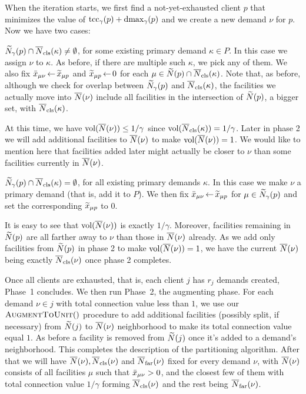 When the iteration starts, we first find a not-yet-exhausted client
$p$ that minimizes the value of $\textrm{tcc}_\gamma(p) + \text{dmax}_\gamma(p)$ and
we create a new demand $\nu$ for $p$.  Now we have two cases:
%
\begin{description}
%
\item{} ${\widetilde N}_{\gamma}(p) \cap
  {\overline{N}}_{\text{cls}}(\kappa)\neq\emptyset$, for some existing primary demand
  $\kappa\in P$.  In this case we assign $\nu$ to $\kappa$. As before, if
  there are multiple such $\kappa$, we pick any of them. We also fix
  ${\bar x}_{\mu \nu} {\,\leftarrow\,} {\widetilde x}_{\mu p}$ and ${\widetilde x}_{\mu p}{\,\leftarrow\,} 0$
  for each $\mu \in {\widetilde N}(p)\cap {\overline{N}}_{\text{cls}}(\kappa)$. Note that, as before,
  although we check for overlap between ${\widetilde N}_{\gamma}(p)$ and
  ${\overline{N}}_{\text{cls}}(\kappa)$, the facilities we actually move into
  ${\overline{N}}(\nu)$ include all facilities in the intersection of
  ${\widetilde N}(p)$, a bigger set, with ${\overline{N}}_{\text{cls}}(\kappa)$.

  At this time, we have $\textrm{vol}({\overline{N}}(\nu)) \leq 1/\gamma$ since
  $\textrm{vol}({\overline{N}}_{\text{cls}}(\kappa)) = 1/\gamma$. Later in phase 2 we will add
  additional facilities to ${\overline{N}}(\nu)$ to make
  $\textrm{vol}({\overline{N}}(\nu))=1$. We would like to mention here that facilities
  added later might actually be closer to $\nu$ than some facilities
  currently in ${\overline{N}}(\nu)$.

%
\item{} ${\widetilde N}_{\gamma}(p) \cap {\overline{N}}_{\text{cls}}(\kappa) =
  \emptyset$, for all existing primary demands $\kappa$.  In this case
  we make $\nu$ a primary demand (that is, add it to $P$). We then fix ${\bar x}_{\mu \nu}{\,\leftarrow\,}
  {\widetilde x}_{\mu p}$ for $\mu \in {\widetilde N}_{\gamma}(p)$ and set the
  corresponding ${\widetilde x}_{\mu p}$ to $0$.  

  It is easy to see that $\textrm{vol}({\overline{N}}(\nu))$ is exactly
  $1/\gamma$. Moreover, facilities remaining in ${\widetilde N}(p)$ are all
  farther away to $\nu$ than those in ${\overline{N}}(\nu)$ already. As we add
  only facilities from ${\widetilde N}(p)$ in phase 2 to make
  $\textrm{vol}({\overline{N}}(\nu))=1$, we have the current ${\overline{N}}(\nu)$ being
  exactly ${\overline{N}}_{\text{cls}}(\nu)$ once phase 2 completes.
%
\end{description}
%
Once all clients are exhausted, that is, each client $j$ has $r_j$
demands created, Phase~1 concludes. We then run Phase~2, the augmenting
phase.  For each demand $\nu\in j$ with total connection
value less than $1$, we use our ${\textsc{AugmentToUnit}}()$ procedure to add
additional facilities (possibly split, if necessary)
 from ${\widetilde N}(j)$ to ${\overline{N}}(\nu)$ neighborhood to
make its total connection value equal $1$. As before a facility is
removed from ${\widetilde N}(j)$ once it's added to a demand's neighborhood. 
This completes the description of the partitioning algorithm. After
that we will have ${\overline{N}}(\nu), {\overline{N}}_{\text{cls}}(\nu)$ and ${\overline{N}}_{\text{far}}(\nu)$
fixed for every demand $\nu$, with ${\overline{N}}(\nu)$ consists of all
facilities $\mu$ such that ${\bar x}_{\mu\nu} > 0$, and the closest few
of them with total connection value $1/\gamma$ forming
${\overline{N}}_{\text{cls}}(\nu)$ and the rest being ${\overline{N}}_{\text{far}}(\nu)$.

